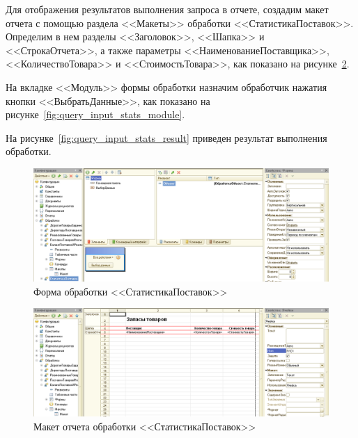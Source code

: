 Для отображения результатов выполнения запроса в отчете,
создадим макет отчета с помощью раздела <<Макеты>> обработки
<<СтатистикаПоставок>>.
Определим в нем разделы <<Заголовок>>, <<Шапка>> и <<СтрокаОтчета>>,
а также параметры <<НаименованиеПоставщика>>, <<КоличествоТовара>> и
<<СтоимостьТовара>>, как показано на рисунке~\ref{fig:query_input_stats_report}.

На вкладке <<Модуль>> формы обработки назначим обработчик нажатия кнопки
<<ВыбратьДанные>>, как показано на рисунке~\ref{fig:query_input_stats_module}.

На рисунке~\ref{fig:query_input_stats_result} приведен результат
выполнения обработки.

\begin{figure}[h!]
  \centering
  \includegraphics[width=150mm]{pic/query_input_stats_form}
  \caption{Форма обработки <<СтатистикаПоставок>>}
  \label{fig:query_input_stats_form}
\end{figure}

\begin{figure}[h!]
  \centering
  \includegraphics[width=150mm]{pic/query_input_stats_report}
  \caption{Макет отчета обработки <<СтатистикаПоставок>>}
  \label{fig:query_input_stats_report}
\end{figure}

